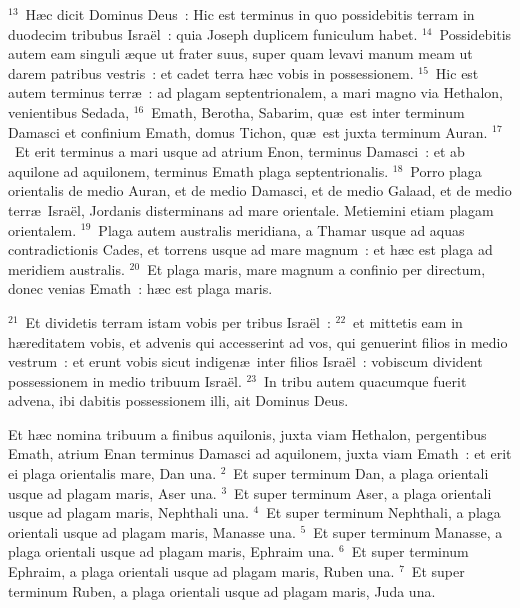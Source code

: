 ${}^{13}$~H\ae c dicit Dominus Deus~: Hic est terminus in quo possidebitis terram in duodecim tribubus Isra\"el~: quia Joseph duplicem funiculum habet.
${}^{14}$~Possidebitis autem eam singuli \ae que ut frater suus, super quam levavi manum meam ut darem patribus vestris~: et cadet terra h\ae c vobis in possessionem.
${}^{15}$~Hic est autem terminus terr\ae~: ad plagam septentrionalem, a mari magno via Hethalon, venientibus Sedada,
${}^{16}$~Emath, Berotha, Sabarim, qu\ae\ est inter terminum Damasci et confinium Emath, domus Tichon, qu\ae\ est juxta terminum Auran.
${}^{17}$~Et erit terminus a mari usque ad atrium Enon, terminus Damasci~: et ab aquilone ad aquilonem, terminus Emath plaga septentrionalis.
${}^{18}$~Porro plaga orientalis de medio Auran, et de medio Damasci, et de medio Galaad, et de medio terr\ae\ Isra\"el, Jordanis disterminans ad mare orientale. Metiemini etiam plagam orientalem.
${}^{19}$~Plaga autem australis meridiana, a Thamar usque ad aquas contradictionis Cades, et torrens usque ad mare magnum~: et h\ae c est plaga ad meridiem australis.
${}^{20}$~Et plaga maris, mare magnum a confinio per directum, donec venias Emath~: h\ae c est plaga maris.


${}^{21}$~Et dividetis terram istam vobis per tribus Isra\"el~:
${}^{22}$~et mittetis eam in h\ae reditatem vobis, et advenis qui accesserint ad vos, qui genuerint filios in medio vestrum~: et erunt vobis sicut indigen\ae\ inter filios Isra\"el~: vobiscum divident possessionem in medio tribuum Isra\"el.
${}^{23}$~In tribu autem quacumque fuerit advena, ibi dabitis possessionem illi, ait Dominus Deus.

\lettrine[lines=10,image=true,loversize=0.05,lraise=-0.03]{E}{}t h\ae c nomina tribuum a finibus aquilonis, juxta viam Hethalon, pergentibus Emath, atrium Enan terminus Damasci ad aquilonem, juxta viam Emath~: et erit ei plaga orientalis mare, Dan una.
${}^{2}$~Et super terminum Dan, a plaga orientali usque ad plagam maris, Aser una.
${}^{3}$~Et super terminum Aser, a plaga orientali usque ad plagam maris, Nephthali una.
${}^{4}$~Et super terminum Nephthali, a plaga orientali usque ad plagam maris, Manasse una.
${}^{5}$~Et super terminum Manasse, a plaga orientali usque ad plagam maris, Ephraim una.
${}^{6}$~Et super terminum Ephraim, a plaga orientali usque ad plagam maris, Ruben una.
${}^{7}$~Et super terminum Ruben, a plaga orientali usque ad plagam maris, Juda una.


